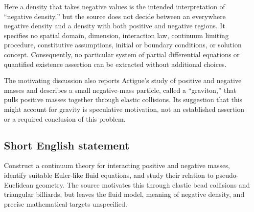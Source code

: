 \documentclass[11pt]{article}
\begin{document}
Here a density that takes negative values is the intended interpretation of ``negative density,'' but the source does not decide between an everywhere negative density and a density with both positive and negative regions. It specifies no spatial domain, dimension, interaction law, continuum limiting procedure, constitutive assumptions, initial or boundary conditions, or solution concept. Consequently, no particular system of partial differential equations or quantified existence assertion can be extracted without additional choices.

The motivating discussion also reports Artigue's study of positive and negative masses and describes a small negative-mass particle, called a ``graviton,'' that pulls positive masses together through elastic collisions. Its suggestion that this might account for gravity is speculative motivation, not an established assertion or a required conclusion of this problem.
\subsection{Short English statement}
Construct a continuum theory for interacting positive and negative masses, identify suitable Euler-like fluid equations, and study their relation to pseudo-Euclidean geometry. The source motivates this through elastic bead collisions and triangular billiards, but leaves the fluid model, meaning of negative density, and precise mathematical targets unspecified.
\end{document}
